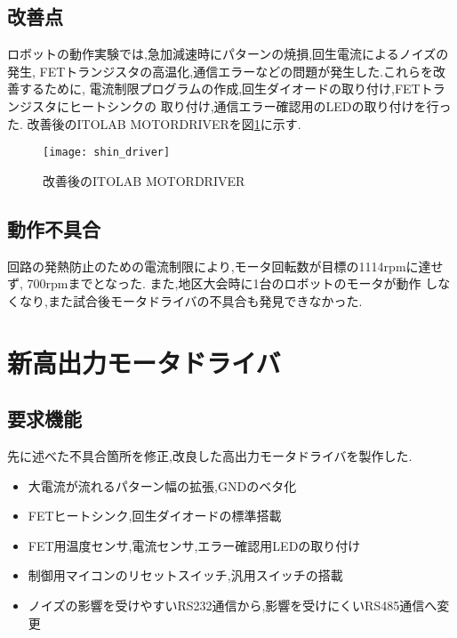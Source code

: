\documentclass[twocolumn,11pt]{abst}
\begin{document}
\subsection{改善点}
ロボットの動作実験では,急加減速時にパターンの焼損,回生電流によるノイズの発生,
FETトランジスタの高温化,通信エラーなどの問題が発生した.これらを改善するために,
電流制限プログラムの作成,回生ダイオードの取り付け,FETトランジスタにヒートシンクの
取り付け,通信エラー確認用のLEDの取り付けを行った.
改善後のITOLAB MOTORDRIVERを図\ref{fig:shin_driver}に示す.
\begin{figure}[H]
  \begin{center}
    \texttt{[image: shin\_driver]}
    \end{center}
  \caption{改善後のITOLAB MOTORDRIVER}
 \label{fig:shin_driver}
\end{figure}

\subsection{動作不具合}
回路の発熱防止のための電流制限により,モータ回転数が目標の1114rpmに達せず,
700rpmまでとなった.
また,地区大会時に1台のロボットのモータが動作
しなくなり,また試合後モータドライバの不具合も発見できなかった.

\section{新高出力モータドライバ}
\subsection{要求機能}
先に述べた不具合箇所を修正,改良した高出力モータドライバを製作した.
\begin{itemize}
\item 大電流が流れるパターン幅の拡張,GNDのベタ化
\item FETヒートシンク,回生ダイオードの標準搭載
\item FET用温度センサ,電流センサ,エラー確認用LEDの取り付け
\item 制御用マイコンのリセットスイッチ,汎用スイッチの搭載
\item ノイズの影響を受けやすいRS232通信から,影響を受けにくいRS485通信へ変更
\end{itemize}
\end{document}
